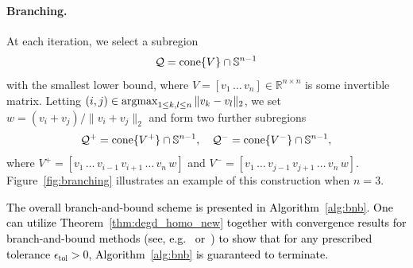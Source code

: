 \documentclass[12pt]{article}
\newcommand{\reals}{\mathbb{R}}
\newcommand{\HSOS}{\widehat{\mathbf{\Sigma}}}
\newcommand{\defeq}{\coloneq}
\newcommand{\st}{\text{s.t.}}
\newcommand{\cone}{\operatornamewithlimits{cone}}
\newcommand{\mcQ}{\mathcal{Q}}
\newcommand{\mbS}{\mathbb{S}}
\theoremstyle{remark}
\begin{document}


\paragraph{Branching.}
At each iteration, we select a subregion
\begin{equation*}
\mcQ=\cone\{V\}\cap\mbS^{n-1}
\end{equation*}
 with the smallest lower bound, where $V = [v_1 \,\ldots\, v_n] \in\reals^{n\times n}$ is some invertible matrix. Letting $(i,j)\in \operatornamewithlimits{argmax}_{1 \le k, l \le n} \|v_k-v_l\|_2$, we 
set~$w= (v_{i}+v_{j})/\|v_{i}+v_{j}\|_2$ and form two further subregions
\[
    \mcQ^+=\cone\{V^+\}\cap \mbS^{n-1},\quad \mcQ^-=\cone\{V^-\}\cap \mbS^{n-1},\]
where $V^+=[v_{1}\, \ldots\, v_{i-1}\, v_{i+1}\, \ldots\, v_{n}\, w]$ and $V^-=[v_{1}\, \ldots\, v_{j-1}\, v_{j+1}\, \ldots\, v_{n}\, w]$.
{
Figure~\ref{fig:branching} illustrates an example of this construction when $n=3$.}

\textcolor{black}{The 
overall branch-and-bound scheme is presented in Algorithm~\ref{alg:bnb}. 
One can utilize Theorem~\ref{thm:degd_homo_new} together with convergence results for branch-and-bound methods (see, e.g.~\cite[Theorem~5.26]{locatelli2013global} or~\cite[Chapter~IV]{horst_global_1996}) to show that for any prescribed tolerance $\epsilon_{\text{tol}}>0$, Algorithm~\ref{alg:bnb} is guaranteed to terminate.}
\end{document}
